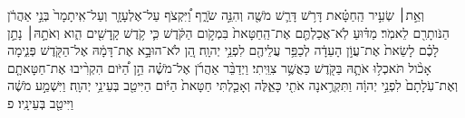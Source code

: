 \documentclass{openreader}
\begin{document}
וְאֵ֣ת׀ שְׂעִ֣יר הַֽחַטָּ֗את דָּרֹ֥שׁ דָּרַ֛שׁ מֹשֶׁ֖ה וְהִנֵּ֣ה שֹׂרָ֑ף וַ֠יִּקְצֹף עַל־אֶלְעָזָ֤ר וְעַל־אִֽיתָמָר֙ בְּנֵ֣י אַהֲרֹ֔ן הַנֹּותָרִ֖ם לֵאמֹֽר׃ 
מַדּ֗וּעַ לֹֽא־אֲכַלְתֶּ֤ם אֶת־הַֽחַטָּאת֙ בִּמְקֹ֣ום הַקֹּ֔דֶשׁ כִּ֛י קֹ֥דֶשׁ קָֽדָשִׁ֖ים הִ֑וא וְאֹתָ֣הּ׀ נָתַ֣ן לָכֶ֗ם לָשֵׂאת֙ אֶת־עֲוֹ֣ן הָעֵדָ֔ה לְכַפֵּ֥ר עֲלֵיהֶ֖ם לִפְנֵ֥י יְהוָֽה׃ 
הֵ֚ן לֹא־הוּבָ֣א אֶת־דָּמָ֔הּ אֶל־הַקֹּ֖דֶשׁ פְּנִ֑ימָה אָכֹ֨ול תֹּאכְל֥וּ אֹתָ֛הּ בַּקֹּ֖דֶשׁ כַּאֲשֶׁ֥ר צִוֵּֽיתִי׃ 
וַיְדַבֵּ֨ר אַהֲרֹ֜ן אֶל־מֹשֶׁ֗ה הֵ֣ן הַ֠יֹּום הִקְרִ֨יבוּ אֶת־חַטָּאתָ֤ם וְאֶת־עֹֽלָתָם֙ לִפְנֵ֣י יְהוָ֔ה וַתִּקְרֶ֥אנָה אֹתִ֖י כָּאֵ֑לֶּה וְאָכַ֤לְתִּי חַטָּאת֙ הַיֹּ֔ום הַיִּיטַ֖ב בְּעֵינֵ֥י יְהוָֽה׃ 
וַיִּשְׁמַ֣ע מֹשֶׁ֔ה וַיִּיטַ֖ב בְּעֵינָֽיו׃ פ 
\end{document}
